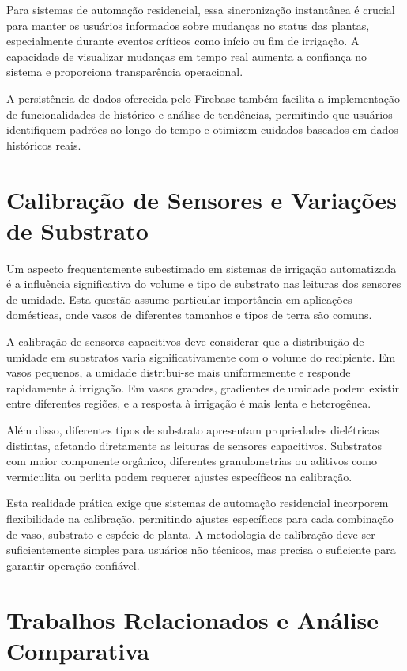 \documentclass[twoside,english,brazilian]{UNISINOSmonografia}
\begin{document}
Para sistemas de automação residencial, essa sincronização instantânea é crucial para manter os usuários informados sobre mudanças no status das plantas, especialmente durante eventos críticos como início ou fim de irrigação. A capacidade de visualizar mudanças em tempo real aumenta a confiança no sistema e proporciona transparência operacional.

A persistência de dados oferecida pelo Firebase também facilita a implementação de funcionalidades de histórico e análise de tendências, permitindo que usuários identifiquem padrões ao longo do tempo e otimizem cuidados baseados em dados históricos reais.

\section{Calibração de Sensores e Variações de Substrato}

Um aspecto frequentemente subestimado em sistemas de irrigação automatizada é a influência significativa do volume e tipo de substrato nas leituras dos sensores de umidade. Esta questão assume particular importância em aplicações domésticas, onde vasos de diferentes tamanhos e tipos de terra são comuns.

A calibração de sensores capacitivos deve considerar que a distribuição de umidade em substratos varia significativamente com o volume do recipiente. Em vasos pequenos, a umidade distribui-se mais uniformemente e responde rapidamente à irrigação. Em vasos grandes, gradientes de umidade podem existir entre diferentes regiões, e a resposta à irrigação é mais lenta e heterogênea.

Além disso, diferentes tipos de substrato apresentam propriedades dielétricas distintas, afetando diretamente as leituras de sensores capacitivos. Substratos com maior componente orgânico, diferentes granulometrias ou aditivos como vermiculita ou perlita podem requerer ajustes específicos na calibração.

Esta realidade prática exige que sistemas de automação residencial incorporem flexibilidade na calibração, permitindo ajustes específicos para cada combinação de vaso, substrato e espécie de planta. A metodologia de calibração deve ser suficientemente simples para usuários não técnicos, mas precisa o suficiente para garantir operação confiável.

\section{Trabalhos Relacionados e Análise Comparativa}
\end{document}
